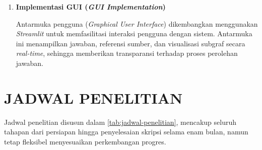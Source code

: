 \begin{enumerate}[label=\textbf{\arabic*.}, leftmargin=*, itemsep=10pt]
          Sistem dianggap berhasil apabila memenuhi standar seluruh metrik tersebut. Untuk memvalidasi efektivitas, dilakukan perbandingan \textit{benchmarking} antara \textit{Baseline} (\textit{Standard Vector RAG}) dengan sistem \textit{Hybrid GraphRAG} yang diusulkan.


    \item \textbf{Implementasi GUI (\textit{GUI Implementation})}

          \hspace*{0.75cm}Antarmuka pengguna (\textit{Graphical User Interface}) dikembangkan menggunakan \textit{Streamlit} untuk memfasilitasi interaksi pengguna dengan sistem. Antarmuka ini menampilkan jawaban, referensi sumber, dan visualisasi subgraf secara \textit{real-time}, sehingga memberikan transparansi terhadap proses perolehan jawaban.
\end{enumerate}

\section{JADWAL PENELITIAN}

Jadwal penelitian disusun dalam \ref{tab:jadwal-penelitian}, mencakup seluruh tahapan dari persiapan hingga penyelesaian skripsi selama enam bulan, namun tetap fleksibel menyesuaikan perkembangan progres.

